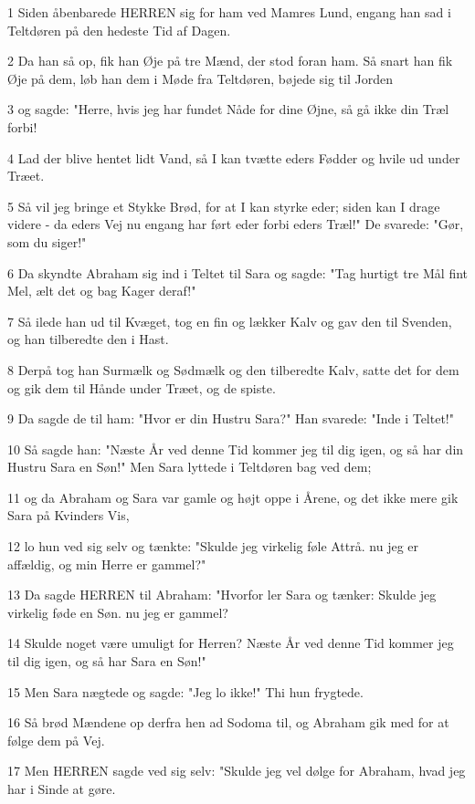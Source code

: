 \par 1 Siden åbenbarede HERREN sig for ham ved Mamres Lund, engang han sad i Teltdøren på den hedeste Tid af Dagen.
\par 2 Da han så op, fik han Øje på tre Mænd, der stod foran ham. Så snart han fik Øje på dem, løb han dem i Møde fra Teltdøren, bøjede sig til Jorden
\par 3 og sagde: "Herre, hvis jeg har fundet Nåde for dine Øjne, så gå ikke din Træl forbi!
\par 4 Lad der blive hentet lidt Vand, så I kan tvætte eders Fødder og hvile ud under Træet.
\par 5 Så vil jeg bringe et Stykke Brød, for at I kan styrke eder; siden kan I drage videre - da eders Vej nu engang har ført eder forbi eders Træl!" De svarede: "Gør, som du siger!"
\par 6 Da skyndte Abraham sig ind i Teltet til Sara og sagde: "Tag hurtigt tre Mål fint Mel, ælt det og bag Kager deraf!"
\par 7 Så ilede han ud til Kvæget, tog en fin og lækker Kalv og gav den til Svenden, og han tilberedte den i Hast.
\par 8 Derpå tog han Surmælk og Sødmælk og den tilberedte Kalv, satte det for dem og gik dem til Hånde under Træet, og de spiste.
\par 9 Da sagde de til ham: "Hvor er din Hustru Sara?" Han svarede: "Inde i Teltet!"
\par 10 Så sagde han: "Næste År ved denne Tid kommer jeg til dig igen, og så har din Hustru Sara en Søn!" Men Sara lyttede i Teltdøren bag ved dem;
\par 11 og da Abraham og Sara var gamle og højt oppe i Årene, og det ikke mere gik Sara på Kvinders Vis,
\par 12 lo hun ved sig selv og tænkte: "Skulde jeg virkelig føle Attrå. nu jeg er affældig, og min Herre er gammel?"
\par 13 Da sagde HERREN til Abraham: "Hvorfor ler Sara og tænker: Skulde jeg virkelig føde en Søn. nu jeg er gammel?
\par 14 Skulde noget være umuligt for Herren? Næste År ved denne Tid kommer jeg til dig igen, og så har Sara en Søn!"
\par 15 Men Sara nægtede og sagde: "Jeg lo ikke!" Thi hun frygtede.
\par 16 Så brød Mændene op derfra hen ad Sodoma til, og Abraham gik med for at følge dem på Vej.
\par 17 Men HERREN sagde ved sig selv: "Skulde jeg vel dølge for Abraham, hvad jeg har i Sinde at gøre.
